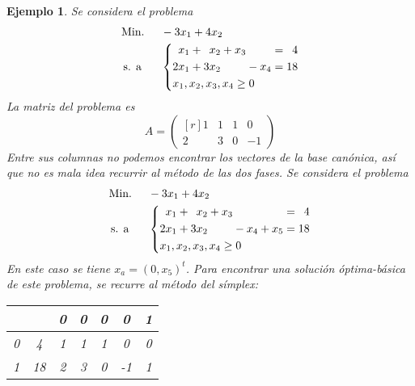 \documentclass[11pt]{report}
\theoremstyle{mytheorem}
\theoremstyle{mydefinition}
\theoremstyle{myexample}
\newtheorem*{example}{Ejemplo}
\begin{document}
\begin{example}
Se considera el problema
\[\begin{aligned}[t]
&\text{Min. } && -3x_1+4x_2 \\
& \, \text{s. a} && \left\{\begin{alignedat}{10}
&  &x_1 & {}+{} &  &x_2 & {}+{} & x_3 &       &     & {}={} & \phantom{0}4 \\
& 2&x_1 & {}+{} & 3&x_2 &       &     & {}-{} & x_4 & {}={} & 18 \\
& \mathrlap{x_1,x_2,x_3,x_4 \geq 0}
\end{alignedat}\right.
\end{aligned}\]
La matriz del problema es
\[A= \begin{pmatrix*}[r]
    1 & 1 & 1 & 0 \\
    2 & 3 & 0 & -1
\end{pmatrix*}\]
Entre sus columnas no podemos encontrar los vectores de la base canónica, así que no es mala idea recurrir al método de las dos fases. Se considera el problema
\[\begin{aligned}[t]
&\text{Min. } && -3x_1+4x_2 \\
& \, \text{s. a} && \left\{\begin{alignedat}{10}
&  &x_1 & {}+{} &  &x_2 & {}+{} & x_3 &       &     &       &     & {}={} & \phantom{0}4 \\
& 2&x_1 & {}+{} & 3&x_2 &       &     & {}-{} & x_4 & {}+{} & x_5 & {}={} & 18 \\
& \mathrlap{x_1,x_2,x_3,x_4 \geq 0}
\end{alignedat}\right.
\end{aligned}\]
En este caso se tiene $x_a = (0,x_5)^t$. Para encontrar una solución óptima-básica de este problema, se recurre al método del símplex:
\begin{center}
\begin{tabular}{|c|c|c|c|c|c|c|}
    \cline{3-7}
    
    \multicolumn{1}{c}{} & \multicolumn{1}{c|}{} & \multicolumn{1}{c}{\phantom{-}0} & \multicolumn{1}{c}{\phantom{-}0} & \multicolumn{1}{c}{\phantom{-}0} & \multicolumn{1}{c}{\phantom{-}0} & \multicolumn{1}{c|}{1} \\ \hline
    
    0 & 4 & \multicolumn{1}{c}{\phantom{-}1} & \multicolumn{1}{c}{\phantom{-}1} & \multicolumn{1}{c}{\phantom{-}1} & \multicolumn{1}{c}{\phantom{-}0} & \multicolumn{1}{c|}{0} \\
    
    1 & 18 & \multicolumn{1}{c}{\phantom{-}2} & \multicolumn{1}{c}{\phantom{-}3} & \multicolumn{1}{c}{\phantom{-}0} & \multicolumn{1}{c}{-1} & \multicolumn{1}{c|}{1} \\ \hline
    

\end{tabular}
\end{center}
\end{example}
\end{document}
